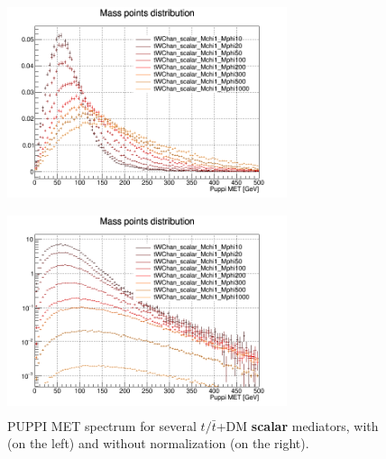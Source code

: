 \documentclass[a4paper, 10pt, openright]{report}
\begin{document}
\begin{figure}[htbp]
\centering
\begin{minipage}[b]{.49\textwidth}
\includegraphics[width=8.2cm, height=6cm]{figs/singleTopMETNorm.png}
\end{minipage}\hfill
\begin{minipage}[b]{.49\textwidth}
\includegraphics[width=8.2cm, height=6cm]{figs/singleTopMET.png}
\end{minipage} \hfill
\caption{\ac{PUPPI} \ac{MET} spectrum for several $t/\bar t$+DM \textbf{scalar} mediators, with (on the left) and without normalization (on the right).}
\label{fig:signalSingleScalar}
\end{figure}
\end{document}

